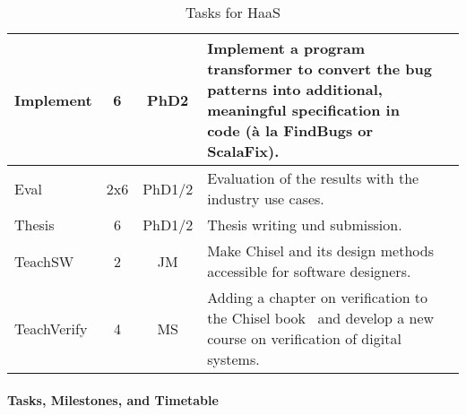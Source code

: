 \documentclass[fleqn,12pt]{article}
\begin{document}
\begin{table*}
{\begin{center}
\begin{tabular}{lccp{110mm}l}
      Implement              & 6   & PhD2      & Implement a program transformer to convert the bug patterns into %
  additional, meaningful  specification in code (\`a la FindBugs or ScalaFix).                                                                 \\
      \midrule
      Eval                   & 2x6 & PhD1/2    & Evaluation of the results with the industry use cases.                                                     \\
      Thesis                 & 6   & PhD1/2    & Thesis writing und submission.                                                                \\
      \midrule
      TeachSW                 &  2  & JM            & Make Chisel and its design methods accessible for software designers. \\
      TeachVerify                & 4   & MS        & Adding a chapter on verification to the Chisel book~\cite{chisel:book} and develop a new course on verification of digital systems.                       \\
      \bottomrule
    \end{tabular}
  \end{center}
  \caption{Tasks for HaaS}\label{tab:packages}
}
\end{table*}





\paragraph*{Tasks, Milestones, and Timetable}
\end{document}
